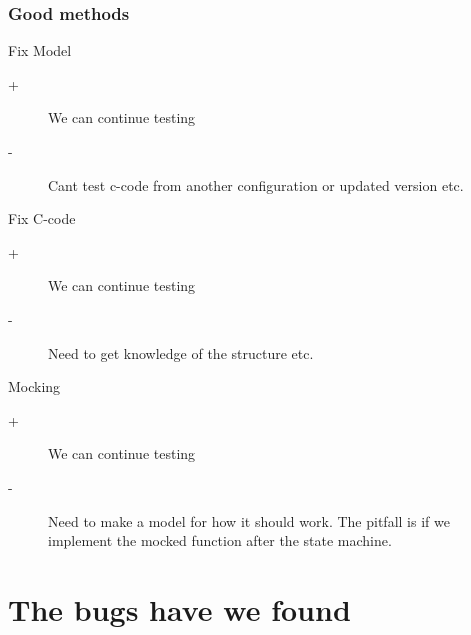 \documentclass{beamer}
\begin{document}

\begin{frame}
  \frametitle{Good methods}
  \begin{block}{Fix Model}
    \begin{description}
      \item[+] We can continue testing
      \item[-] Cant test c-code from another configuration or updated version etc.
    \end{description}
  \end{block}

  \begin{block}{Fix C-code}
    \begin{description}
      \item[+] We can continue testing
      \item[-] Need to get knowledge of the structure etc.
    \end{description}
  \end{block}

  \begin{block}{Mocking}
    \begin{description}
      \item[+] We can continue testing
      \item[-] Need to make a model for how it should work. The pitfall is if we
        implement the mocked function after the state machine.
    \end{description}
  \end{block}
\end{frame}

\section{The bugs have we found}
\end{document}
